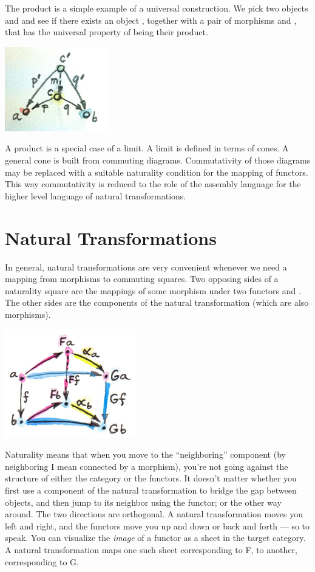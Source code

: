 The product is a simple example of a universal construction. We pick two
objects  and  and see if there exists an object
, together with a pair of morphisms  and ,
that has the universal property of being their product.

\includegraphics[width=1.78125in]{images/productranking.jpg}

A product is a special case of a limit. A limit is defined in terms of
cones. A general cone is built from commuting diagrams. Commutativity of
those diagrams may be replaced with a suitable naturality condition for
the mapping of functors. This way commutativity is reduced to the role
of the assembly language for the higher level language of natural
transformations.

\section{Natural Transformations}\label{natural-transformations}

In general, natural transformations are very convenient whenever we need
a mapping from morphisms to commuting squares. Two opposing sides of a
naturality square are the mappings of some morphism  under two
functors  and . The other sides are the components
of the natural transformation (which are also morphisms).

\includegraphics[width=2.25000in]{images/3_naturality.jpg}

Naturality means that when you move to the ``neighboring'' component (by
neighboring I mean connected by a morphism), you're not going against
the structure of either the category or the functors. It doesn't matter
whether you first use a component of the natural transformation to
bridge the gap between objects, and then jump to its neighbor using the
functor; or the other way around. The two directions are orthogonal. A
natural transformation moves you left and right, and the functors move
you up and down or back and forth --- so to speak. You can visualize the
\emph{image} of a functor as a sheet in the target category. A natural
transformation maps one such sheet corresponding to F, to another,
corresponding to G.

